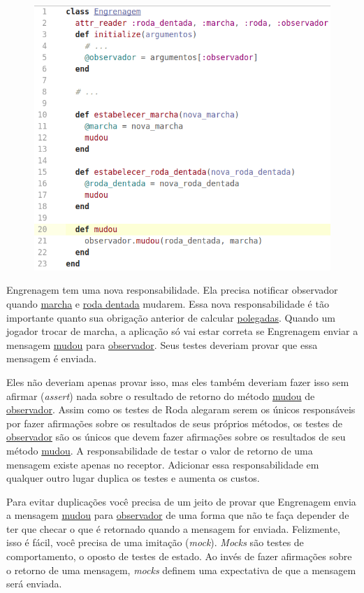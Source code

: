 \begin{figure}[!htbp]
  \center
  \includegraphics[scale=0.50]{imagens/codigo_pag_216.png}
  \label{img:codigo_pag_216}
\end{figure}

Engrenagem tem uma nova responsabilidade. Ela precisa notificar observador quando \underline{marcha} e \underline{roda dentada} mudarem. Essa nova responsabilidade é tão importante quanto sua obrigação anterior de calcular \underline{polegadas}. Quando um jogador trocar de marcha, a aplicação só vai estar correta se Engrenagem enviar a mensagem \underline{mudou} para \underline{observador}. Seus testes deveriam provar que essa mensagem é enviada.

Eles não deveriam apenas provar isso, mas eles também deveriam fazer isso sem afirmar (\textit{assert}) nada sobre o resultado de retorno do método \underline{mudou} de \underline{observador}. Assim como os testes de Roda alegaram serem os únicos responsáveis por fazer afirmações sobre os resultados de seus próprios métodos, os testes de \underline{observador} são os únicos que devem fazer afirmações sobre os resultados de seu método \underline{mudou}. A responsabilidade de testar o valor de retorno de uma mensagem existe apenas no receptor. Adicionar essa responsabilidade em qualquer outro lugar duplica os testes e aumenta os custos.

Para evitar duplicações você precisa de um jeito de provar que Engrenagem envia a mensagem \underline{mudou} para \underline{observador} de uma forma que não te faça depender de ter que checar o que é retornado quando a mensagem for enviada.  Felizmente, isso é fácil, você precisa de uma imitação (\textit{mock}). \textit{Mocks} são testes de comportamento, o oposto de testes de estado. Ao invés de fazer afirmações sobre o retorno de uma mensagem, \textit{mocks} definem uma expectativa de que a mensagem será enviada.

